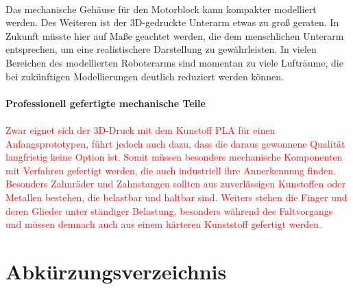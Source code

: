 \documentclass[titlepage,12pt,twoside]{article}
\begin{document}
\\
Das mechanische Gehäuse für den Motorblock kann kompakter modelliert werden. Des Weiteren ist der 
3D-gedruckte Unterarm etwas zu groß geraten. In Zukunft müsste hier auf Maße geachtet werden, die 
dem menschlichen Unterarm entsprechen, um eine realistischere Darstellung zu gewährleisten. 
In vielen Bereichen des modellierten Roboterarms sind momentan zu viele Lufträume, die bei 
zukünftigen Modellierungen deutlich reduziert werden können. \\
\\
\textbf{Professionell gefertigte mechanische Teile} \\
\\
\textcolor{red}{
Zwar eignet sich der 3D-Druck mit dem Kunstoff PLA für einen Anfangsprototypen, führt jedoch auch dazu, dass die daraus gewonnene Qualität langfristig keine Option ist.
Somit müssen besonders mechanische Komponenten mit Verfahren gefertigt werden, die auch industriell ihre Annerkennung finden. Besonders Zahnräder und Zahnstangen
sollten aus zuverlässigen Kunstoffen oder Metallen bestehen, die belastbar und haltbar sind. Weiters stehen die Finger und deren Glieder unter ständiger Belastung, 
besonders während des Faltvorgangs und müssen demnach auch aus einem härteren Kunststoff gefertigt werden.
}
\\

\newpage
\section{Abkürzungsverzeichnis}
\end{document}
